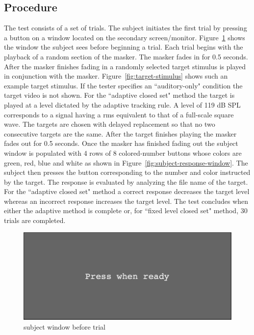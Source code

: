 \documentclass[11pt,pdftex,letterpaper]{article}
\begin{document}
\noindent\begin{minipage}{\textwidth}

\end{minipage}


\subsection{Procedure}
The test consists of a set of trials. The subject initiates the first trial by pressing a button on a window located on the secondary screen/monitor. Figure~\ref{fig:subject-ready-window} shows the window the subject sees before beginning a trial. Each trial begins with the playback of a random section of the masker. The masker fades in for 0.5 seconds. After the masker finishes fading in a randomly selected target stimulus is played in conjunction with the masker. Figure~\ref{fig:target-stimulus} shows such an example target stimulus.
If the tester specifies an ``auditory-only" condition the target video is not shown. For the ``adaptive closed set" method the target is played at a level dictated by the adaptive tracking rule. A level of 119 dB SPL corresponds to a signal having a rms equivalent to that of a full-scale square wave. The targets are chosen with delayed replacement so that no two consecutive targets are the same. After the target finishes playing the masker fades out for 0.5 seconds. Once the masker has finished fading out the subject window is populated with 4 rows of 8 colored-number buttons whose colors are green, red, blue and white as shown in Figure~\ref{fig:subject-response-window}. The subject then presses the button corresponding to the number and color instructed by the target. The response is evaluated by analyzing the file name of the target. For the ``adaptive closed set" method a correct response decreases the target level whereas an incorrect response increases the target level. The test concludes when either the adaptive method is complete or, for ``fixed level closed set" method, 30 trials are completed.

\begin{figure}
\centering
\includegraphics[width = 0.9\linewidth]{subject-ready-window.png}
\caption{subject window before trial}
\label{fig:subject-ready-window}
\end{figure}
\end{document}
